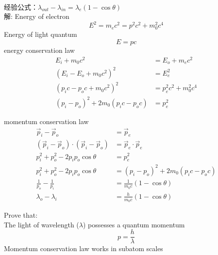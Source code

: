 \begin{frame} 
    ~~\\ 
    经验公式：$\lambda_{out}-\lambda_{in}=\lambda_e(1-\cos \theta)$ \\  \vspace*{0.6em}
    \alert{解:} Energy of electron 
    \begin{equation*}
        E^2 =m_ec^2=p^2c^2 +m_0 ^2 c^4 
    \end{equation*}
    Energy of light quantum
    \begin{equation*}
        E =pc 
    \end{equation*}
    energy conservation law
    \begin{equation*}
        \begin{split}
        E_i + m_0 c^2 &= E_o + m_ec^2 \\
        (E_i -E_o + m_0 c^2)^2 &= E_e ^2\\
        (p_i c-p_o c + m_0 c^2) ^2 &= p_e ^2 c^2 +m_0 ^2 c^4 \\
        (p_i-p_o)^2 +2 m_0 (p_i c-p_o c) &= p_e ^2
    \end{split}
    \end{equation*}
\end{frame}

\begin{frame}  
    momentum conservation law
    \begin{equation*}
        \begin{split}
            \vec{p}_i -\vec{p}_o &= \vec{p}_e \\
            (\vec{p}_i -\vec{p}_o)\cdot (\vec{p}_i -\vec{p}_o)  &= \vec{p}_e\cdot \vec{p}_e   \\
            p_i ^2 + p_o ^2 -2p_i p_o \cos \theta &= p_e ^2  \\
            p_i ^2 + p_o ^2 -2p_i p_o \cos \theta &= (p_i-p_o)^2 +2 m_0 (p_i c-p_o c) \\
            \frac{1}{p_o} -\frac{1}{p_i} &= \frac{1}{m_0 c} (1-\cos \theta) \\
            \lambda_o -\lambda_i &= \frac{h}{m_0 c} (1-\cos \theta) 
        \end{split}
    \end{equation*}
\end{frame}

\begin{frame}   
    \begin{tcolorbox3}[Significance]
        Prove that:\\
        {\Bullet} The light of wavelength ($\lambda$) possesses a quantum momentum \[p=\frac{h}{\lambda}\]
        {\Bullet} Momentum conservation law works in subatom scales 
    \end{tcolorbox3}   
    \color{deepred}{Nobel Prize in physics（1927）}\\
\end{frame}


